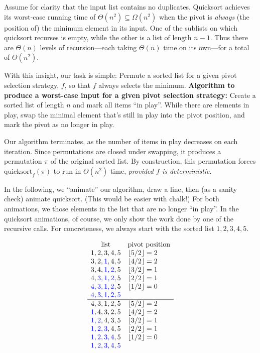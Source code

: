 \documentclass[a4paper]{article}
\newcommand*{\floor}[1]{\left\lfloor{#1}\right\rfloor}
\begin{document}
Assume for clarity that the input list contains no duplicates.
Quicksort achieves its worst-case running time of $\Theta(n^2) \subseteq \Omega(n^2)$ when the pivot is \emph{always} (the position of) the minimum element in its input.
One of the sublists on which quicksort recurses is empty, while the other is a list of length $n-1$.
Thus there are $\Theta(n)$ levels of recursion---each taking $\Theta(n)$ time on its own---for a total of $\Theta(n^2)$.

With this insight, our task is simple:
Permute a sorted list for a given pivot selection strategy, $f$, so that $f$ always selects the minimum.
\textbf{Algorithm to produce a worst-case input for a given pivot selection strategy:}
Create a sorted list of length $n$ and mark all items ``in play''.
While there are elements in play, swap the minimal element that's still in play into the pivot position, and mark the pivot as no longer in play.

Our algorithm terminates, as the number of items in play decreases on each iteration.
Since permutations are closed under swapping, it produces a permutation $\pi$ of the original sorted list.
By construction, this permutation forces $\text{quicksort}_{f}(\pi)$ to run in $\Theta(n^2)$ time, \emph{provided $f$ is deterministic}.

In the following, we ``animate'' our algorithm, draw a line, then (as a sanity check) animate quicksort.
(This would be easier with chalk!)
For both animations, we  those elements in the list that are no longer ``in play''.
In the quicksort animations, of course, we only show the work done by one of the recursive calls.
For concreteness, we always start with the sorted list $1, 2, 3, 4, 5$.

	\[
		\begin{array}{cl}
		\text{list} & \text{pivot position} \\
		1, 2, 3, 4, 5	&\floor{5/2} = 2\\
		3, 2, \USED{1}, 4, 5	&\floor{4/2} = 2 \\
		3, 4, \USED{1, 2}, 5	&\floor{3/2} = 1 \\
		4, \USED{3, 1, 2}, 5	&\floor{2/2} = 1 \\
		\USED{4, 3, 1, 2}, 5	&\floor{1/2} = 0 \\
		\USED{4, 3, 1, 2, 5}	\\\hline
		4, 3, 1, 2, 5	& \floor{5/2} = 2 \\
		\USED{1}, 4, 3, 2, 5	&\floor{4/2} = 2 \\
		\USED{1, 2}, 4, 3, 5	&\floor{3/2} = 1 \\
		\USED{1, 2, 3}, 4, 5	&\floor{2/2} = 1 \\
		\USED{1, 2, 3, 4}, 5	&\floor{1/2} = 0 \\
		\USED{1, 2, 3, 4, 5}
		\end{array}
	\]
\end{document}

